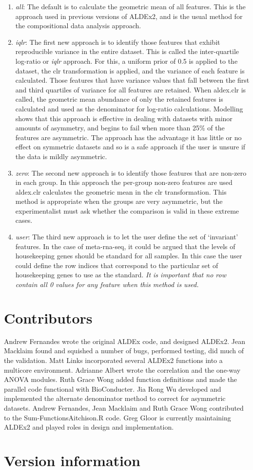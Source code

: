 \documentclass[11pt]{article}
\begin{document}
\begin{enumerate}
\item{\emph{all}: The default  is to calculate the geometric mean of all features. This is the approach used in previous versions of ALDEx2, and is the usual method for the compositional data analysis approach.}
\item{\emph{iqlr}: The first new approach is to identify those features that exhibit reproducible variance in the entire dataset. This is called the inter-quartile log-ratio or \emph{iqlr} approach. For this, a uniform prior of 0.5 is applied to the dataset, the clr transformation is applied, and the variance of each feature is calculated. Those features that have variance values that fall between the first and third quartiles of variance for all features are retained. When aldex.clr is called, the geometric mean abundance of only the retained features is calculated and used as  the denominator for log-ratio calculations. Modelling shows that this approach is effective in dealing with datasets with minor amounts of asymmetry, and begins to fail when more than 25\% of the features are asymmetric. The approach has the advantage it has little or no effect on symmetric datasets and so is a safe approach if the user is unsure if the data is mildly asymmetric.  }
\item{\emph{zero}: The second new approach is to identify those features that are non-zero in each group. In this approach the per-group non-zero features are used aldex.clr calculates the geometric mean in the clr transformation. This method is appropriate when the groups are very asymmetric, but the experimentalist must ask whether the comparison is valid in these extreme cases.}
\item{\emph{user}: The third new approach is to let the user define the set of `invariant' features. In the case of meta-rna-seq, it could be argued that the levels of housekeeping genes should be standard for all samples. In this case the user could define the row indices that correspond to the particular set of housekeeping genes to use as the standard. \emph{It is important that no row contain all 0 values for any feature when this method is used.} }
\end{enumerate}

\newpage
\section{Contributors}
Andrew Fernandes wrote the original ALDEx code, and designed ALDEx2. Jean Macklaim found and squished a number of bugs, performed  testing, did much of the validation. Matt Links incorporated several ALDEx2 functions into a multicore environment. Adrianne Albert wrote the correlation and the one-way ANOVA modules. Ruth Grace Wong added function definitions and made the parallel code functional with BioConducter. Jia Rong Wu developed and implemented the alternate denominator method to correct for asymmetric datasets. Andrew Fernandes, Jean Macklaim and Ruth Grace Wong contributed to the Sum-FunctionsAitchison.R code. Greg Gloor is currently maintaining ALDEx2 and played roles in design and implementation.

\section{Version information}
\end{document}

